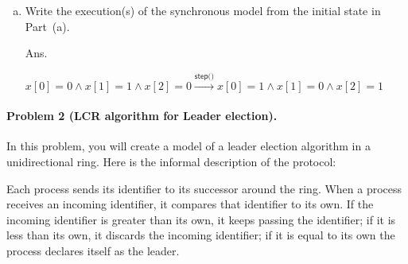 \documentclass[11pt]{article}
\begin{document}
\begin{enumerate}[(a)]
\item Write the execution(s) of the synchronous model from the initial state in Part~(a).

Ans.

$x[0] = 0 \land x[1] = 1 \land x[2] = 0 \xrightarrow{\textsf{step()}} x[0] = 1 \land x[1] = 0 \land x[2] = 1$

\end{enumerate}

\paragraph{Problem 2 (LCR algorithm for Leader election).}
In this problem, you will create a model of a leader election algorithm in a unidirectional ring. Here is the informal description of the protocol:

Each process sends its identifier to its successor around the ring. When a process receives an incoming identifier, it compares that identifier to its own. If the incoming identifier is greater than its own, it keeps passing the identifier; if it is less than its own, it discards the incoming identifier; if it is equal to its own the process declares itself as the leader. 
\end{document}
